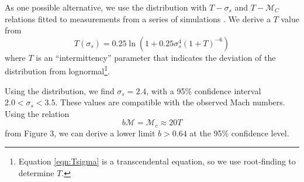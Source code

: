 
As one possible alternative, we use the
\citet{Hopkins2013a} distribution with $T-\sigma_s$ and $T-\mathcal{M}_C$
relations fitted to measurements from a series of simulations
\citep{Kowal2007a,Kritsuk2007a,Schmidt2009a,Federrath2010a,Federrath2012a,Konstandin2012a,Molina2012a}.
We derive a $T$ value from 
\begin{equation} 
    \label{eqn:Tsigma}
    T(\sigma_s) = 0.25 \ln (1+0.25 \sigma_s^4 (1+T)^{-6})
\end{equation}
where $T$ is an ``intermittency'' parameter that indicates the
deviation of the distribution from lognormal\footnote{Equation \ref{eqn:Tsigma}
is a transcendental equation, so we use root-finding to determine $T$.}.  

Using the \citet{Hopkins2013a} distribution, we find $\sigma_s=2.4$, with
a 95\% confidence interval $2.0 < \sigma_s < 3.5$.  These values are
compatible with the observed Mach numbers.  Using the relation 
\begin{equation}
    \label{eqn:McMT}
    b \mathcal{M} = \mathcal{M}_c  \approx 20 T
\end{equation}
from \citet{Hopkins2013a} Figure 3, we can derive a lower limit $b>0.64$ at the
95\% confidence level.%


% 
% 
% 


